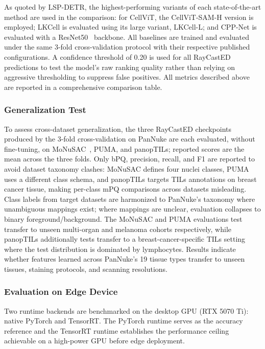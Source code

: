 As quoted by LSP-DETR, the highest-performing variants of each state-of-the-art method are used in the comparison: for CellViT, the CellViT-SAM-H version is employed; LKCell is evaluated using its large variant, LKCell-L; and CPP-Net is evaluated with a ResNet50~\cite{he2016resnet} backbone. All baselines are trained and evaluated under the same 3-fold cross-validation protocol with their respective published configurations. A confidence threshold of 0.20 is used for all RayCastED predictions to test the model's raw ranking quality rather than relying on aggressive thresholding to suppress false positives. All metrics described above are reported in a comprehensive comparison table.

\subsubsection{Generalization Test}

To assess cross-dataset generalization, the three RayCastED checkpoints produced by the 3-fold cross-validation on PanNuke are each evaluated, without fine-tuning, on MoNuSAC~\cite{verma2021monusac}, PUMA, and panopTILs; reported scores are the mean across the three folds. Only bPQ, precision, recall, and F1 are reported to avoid dataset taxonomy clashes: MoNuSAC defines four nuclei classes, PUMA uses a different class schema, and panopTILs targets TILs annotations on breast cancer tissue, making per-class mPQ comparisons across datasets misleading. Class labels from target datasets are harmonized to PanNuke's taxonomy where unambiguous mappings exist; where mappings are unclear, evaluation collapses to binary foreground/background. The MoNuSAC and PUMA evaluations test transfer to unseen multi-organ and melanoma cohorts respectively, while panopTILs additionally tests transfer to a breast-cancer-specific TILs setting where the test distribution is dominated by lymphocytes. Results indicate whether features learned across PanNuke's 19 tissue types transfer to unseen tissues, staining protocols, and scanning resolutions.

\subsubsection{Evaluation on Edge Device}

Two runtime backends are benchmarked on the desktop GPU (RTX 5070 Ti): native PyTorch and TensorRT. The PyTorch runtime serves as the accuracy reference and the TensorRT runtime establishes the performance ceiling achievable on a high-power GPU before edge deployment.

